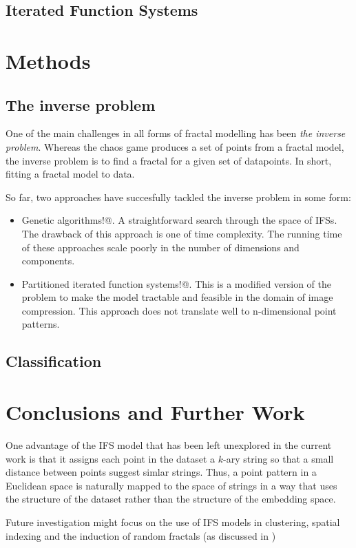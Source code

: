 \documentclass{article}
\theoremstyle{definition}
\begin{document}
\subsection{Iterated Function Systems}


\section{Methods}
\subsection{The inverse problem}
One of the main challenges in all forms of fractal modelling has been \textit{the inverse problem}. Whereas the chaos game produces a set of points from a fractal model, the inverse problem is to find a fractal for a given set of datapoints. In short, fitting a fractal model to data.

So far, two approaches have succesfully tackled the inverse problem in some form:
\begin{itemize}
  \item Genetic algorithms!@. A straightforward search through the space of IFSs. The drawback of this approach is one of time complexity. The running time of these approaches scale poorly in the number of dimensions and components.
  \item Partitioned iterated function systems!@. This is a modified version of the problem to make the model tractable and feasible in the domain of image compression. This approach does not translate well to n-dimensional point patterns.
\end{itemize}

\subsection{Classification}
\section{Conclusions and Further Work}

One advantage of the IFS model that has been left unexplored in the current work is that it assigns each point in the dataset a $k$-ary string so that a small distance between points suggest simlar strings. Thus, a point pattern in a Euclidean space is naturally mapped to the space of strings in a way that uses the structure of the dataset rather than the structure of the embedding space.

Future investigation might focus on the use of IFS models in clustering, spatial indexing and the induction of random fractals (as discussed in \cite{})
\end{document}
